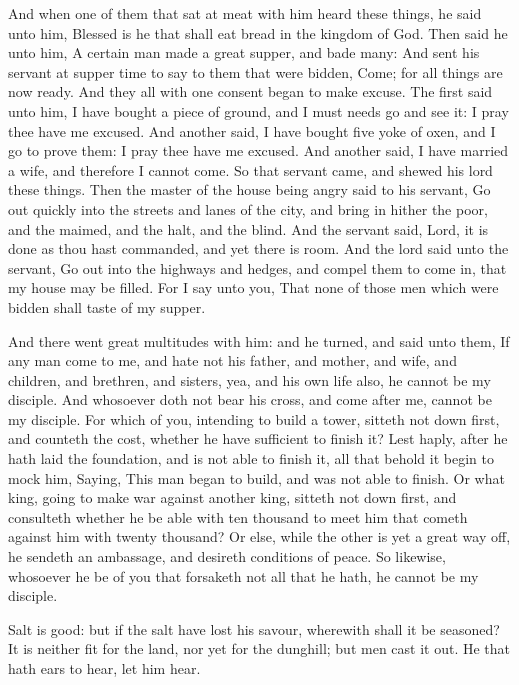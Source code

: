  And when one of them that sat at meat with him heard these
things, he said unto him, Blessed is he that shall eat bread in the
kingdom of God.  Then said he unto him, A certain man made
a great supper, and bade many:  And sent his servant at
supper time to say to them that were bidden, Come; for all things are
now ready.  And they all with one consent began to make
excuse. The first said unto him, I have bought a piece of ground, and I
must needs go and see it: I pray thee have me excused.  And
another said, I have bought five yoke of oxen, and I go to prove them: I
pray thee have me excused.  And another said, I have
married a wife, and therefore I cannot come.  So that
servant came, and shewed his lord these things. Then the master of the
house being angry said to his servant, Go out quickly into the streets
and lanes of the city, and bring in hither the poor, and the maimed, and
the halt, and the blind.  And the servant said, Lord, it is
done as thou hast commanded, and yet there is room.  And
the lord said unto the servant, Go out into the highways and hedges, and
compel them to come in, that my house may be filled.  For I
say unto you, That none of those men which were bidden shall taste of my
supper.

 And there went great multitudes with him: and he turned,
and said unto them,  If any man come to me, and hate not
his father, and mother, and wife, and children, and brethren, and
sisters, yea, and his own life also, he cannot be my disciple.
 And whosoever doth not bear his cross, and come after me,
cannot be my disciple.  For which of you, intending to
build a tower, sitteth not down first, and counteth the cost, whether he
have sufficient to finish it?  Lest haply, after he hath
laid the foundation, and is not able to finish it, all that behold it
begin to mock him,  Saying, This man began to build, and
was not able to finish.  Or what king, going to make war
against another king, sitteth not down first, and consulteth whether he
be able with ten thousand to meet him that cometh against him with
twenty thousand?  Or else, while the other is yet a great
way off, he sendeth an ambassage, and desireth conditions of peace.
 So likewise, whosoever he be of you that forsaketh not all
that he hath, he cannot be my disciple.

 Salt is good: but if the salt have lost his savour,
wherewith shall it be seasoned?  It is neither fit for the
land, nor yet for the dunghill; but men cast it out. He that hath ears
to hear, let him hear.

